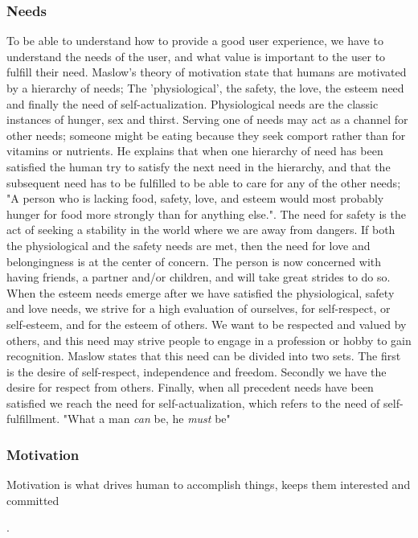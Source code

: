 \subsubsection{Needs}
To be able to understand how to provide a good user experience, we have to understand the needs of the user, and what value is important to the user to fulfill their need. Maslow’s theory of motivation \cite{Maslow1943} state that humans are motivated by a hierarchy of needs; The 'physiological', the safety, the love, the esteem need and finally the need of self-actualization. Physiological needs are the classic instances of hunger, sex and thirst. Serving one of needs may act as a channel for other needs; someone might be eating because they seek comport rather than for vitamins or nutrients. He explains that when one hierarchy of need has been satisfied the human try to satisfy the next need in the hierarchy, and that the subsequent need has to be fulfilled to be able to care for any of the other needs; "A person who is lacking food, safety, love, and esteem would most probably hunger for food more strongly than for anything else.". The need for safety is the act of seeking a stability in the world where we are away from dangers. If both the physiological and the safety needs are met, then the need for love and belongingness is at the center of concern. The person is now concerned with having friends, a partner and/or children, and will take great strides to do so. When the esteem needs emerge after we have satisfied the physiological, safety and love needs, we strive for a high evaluation of ourselves, for self-respect, or self-esteem, and for the esteem of others. We want to be respected and valued by others, and this need may strive people to engage in a profession or hobby to gain recognition. Maslow states that this need can be divided into two sets. The first is the desire of self-respect, independence and freedom. Secondly we have the desire for respect from others. Finally, when all precedent needs have been satisfied we reach the need for self-actualization, which refers to the need of self-fulfillment. "What a man \textit{can} be, he \textit{must} be"


\subsubsection{Motivation}

Motivation is what drives human to accomplish things, keeps them interested and committed .

